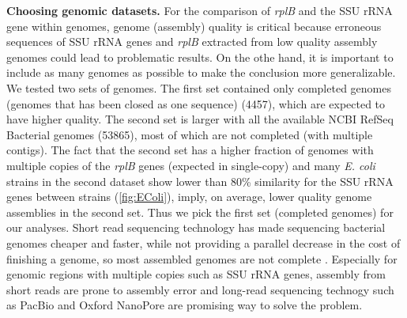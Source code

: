\documentclass[]{msu-thesis}
\begin{document}
\textbf{Choosing genomic datasets. }
For the comparison of \textit{rplB} and the SSU rRNA gene within genomes, genome (assembly) quality is critical because erroneous sequences of SSU rRNA genes and \textit{rplB} extracted from low quality assembly genomes could lead to problematic results. On the othe hand, it is important to include as many genomes as possible to make the conclusion more generalizable. We tested two sets of genomes. The first set contained only completed genomes (genomes that has been closed as one sequence) (4457), which are expected to have higher quality. The second set is larger with all the available NCBI RefSeq Bacterial genomes (53865), most of which are not completed (with multiple contigs). The fact that the second set has a higher fraction of genomes with multiple copies of the \textit{rplB} genes (expected in single-copy) and many \textit{E. coli} strains in the second dataset show lower than 80\% similarity for the SSU rRNA genes between strains (\cref{fig:EColi}), imply, on average, lower quality genome assemblies in the second set. Thus we pick the first set (completed genomes) for our analyses. Short read sequencing technology has made sequencing bacterial genomes cheaper and faster, while not providing a parallel decrease in the cost of finishing a genome, so most assembled genomes are not complete \cite{land_insights_2015}. Especially for genomic regions with multiple copies such as SSU rRNA genes, assembly from short reads are prone to assembly error and long-read sequencing technogy such as PacBio and Oxford NanoPore  are promising way to solve the problem.
\end{document}
